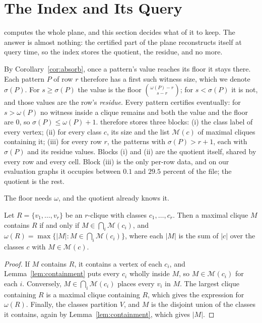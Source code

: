 \section{The Index and Its Query}\label{sec:index}
\buildalg{} computes the whole plane, and this section decides what of it to keep.
%
The answer is almost nothing: the certified part of the plane reconstructs itself at query time, so the index stores the quotient, the residue, and no more.

By Corollary~\ref{cor:absorb}, once a pattern's value reaches its floor it stays there.
%
Each pattern $P$ of row $r$ therefore has a first such witness size, which we denote $\sigma(P)$.
%
For $s\ge\sigma(P)$ the value is the floor $\binom{\omega(P)-r}{s-r}$; for $s<\sigma(P)$ it is not, and those values are the row's \emph{residue}.
%
Every pattern certifies eventually: for $s>\omega(P)$ no witness inside a clique remains and both the value and the floor are $0$, so $\sigma(P)\le\omega(P)+1$.
%
\nsi{} therefore stores three blocks:
(i) the class label of every vertex;
(ii) for every class $c$, its size and the list $\mathcal{M}(c)$ of maximal cliques containing it;
(iii) for every row $r$, the patterns with $\sigma(P)>r+1$, each with $\sigma(P)$ and its residue values.
%
Blocks (i) and (ii) are the quotient itself, shared by every row and every cell.
%
Block (iii) is the only per-row data, and on our evaluation graphs it occupies between $0.1$ and $29.5$ percent of the file; the quotient is the rest.

The floor needs $\omega$, and the quotient already knows it.

\begin{lemma}[Reconstruction]\label{lem:reconstruct}
Let $R=\{v_1,\dots,v_r\}$ be an $r$-clique with classes $c_1,\dots,c_r$.
%
Then a maximal clique $M$ contains $R$ if and only if $M\in\bigcap_i\mathcal{M}(c_i)$, and
$\omega(R)=\max\{|M|: M\in\bigcap_i\mathcal{M}(c_i)\}$, where each $|M|$ is the sum of $|c|$ over the classes $c$ with $M\in\mathcal{M}(c)$.
\end{lemma}

\begin{proof}
If $M$ contains $R$, it contains a vertex of each $c_i$, and Lemma~\ref{lem:containment} puts every $c_i$ wholly inside $M$, so $M\in\mathcal{M}(c_i)$ for each $i$.
%
Conversely, $M\in\bigcap_i\mathcal{M}(c_i)$ places every $v_i$ in $M$.
%
The largest clique containing $R$ is a maximal clique containing $R$, which gives the expression for $\omega(R)$.
%
Finally, the classes partition $V$, and $M$ is the disjoint union of the classes it contains, again by Lemma~\ref{lem:containment}, which gives $|M|$.
\end{proof}

